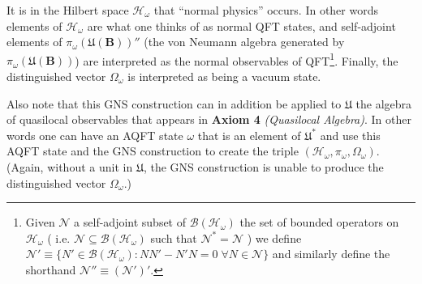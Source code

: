 It is in the Hilbert space $\mathcal{H}_\omega$ that ``normal physics'' occurs. In other words elements of $\mathcal{H}_\omega$ are what one thinks of as normal QFT states, and self-adjoint elements of $\pi_\omega(\mathfrak{U}(\mathbf{B}))''$ (the von Neumann algebra generated by $\pi_\omega(\mathfrak{U}(\mathbf{B}))$) are interpreted as the normal observables of QFT\footnote{Given $\mathcal{N}$ a self-adjoint subset of $\mathcal{B}(\mathcal{H}_\omega)$ the set of bounded operators on $\mathcal{H}_\omega$ ( i.e. $\mathcal{N} \subseteq \mathcal{B}(\mathcal{H}_\omega)$ such that $\mathcal{N}^*=\mathcal{N}$ ) we define $\mathcal{N}' \equiv \{ N' \in \mathcal{B}(\mathcal{H}_\omega) : NN' - N'N = 0 \; \forall N \in \mathcal{N} \}$ and similarly define the shorthand $\mathcal{N}'' \equiv (\mathcal{N}')'$.}. Finally, the distinguished vector $\Omega_\omega$ is interpreted as being a vacuum state.

Also note that this GNS construction can in addition be applied to $\mathfrak{U}$ the algebra of quasilocal observables that appears in \textbf{Axiom 4} \textit{(Quasilocal Algebra)}. In other words one can have an AQFT state $\omega$ that is an element of $\mathfrak{U}^*$ and use this AQFT state and the GNS construction to create the triple $(\mathcal{H}_\omega, \pi_\omega, \Omega_\omega)$. (Again, without a unit in $\mathfrak{U}$, the GNS construction is unable to produce the distinguished vector $\Omega_\omega$.)
